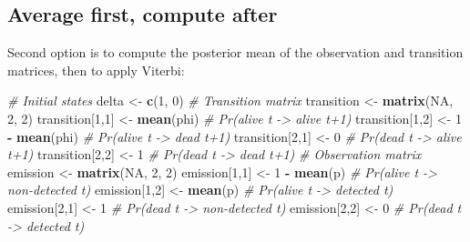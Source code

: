 \documentclass[
  12pt,
]{krantz}
\newenvironment{Shaded}{\begin{snugshade}}{\end{snugshade}}
\newcommand{\CommentTok}[1]{\textcolor[rgb]{0.56,0.35,0.01}{\textit{#1}}}
\newcommand{\ConstantTok}[1]{\textcolor[rgb]{0.56,0.35,0.01}{#1}}
\newcommand{\DecValTok}[1]{\textcolor[rgb]{0.00,0.00,0.81}{#1}}
\newcommand{\FunctionTok}[1]{\textcolor[rgb]{0.13,0.29,0.53}{\textbf{#1}}}
\newcommand{\NormalTok}[1]{#1}
\newcommand{\OtherTok}[1]{\textcolor[rgb]{0.56,0.35,0.01}{#1}}
\newcommand{\SpecialCharTok}[1]{\textcolor[rgb]{0.81,0.36,0.00}{\textbf{#1}}}
\begin{document}
\subsection{Average first, compute after}\label{average-first-compute-after}

Second option is to compute the posterior mean of the observation and transition matrices, then to apply Viterbi:

\begin{Shaded}
\begin{Highlighting}[]
\CommentTok{\# Initial states}
\NormalTok{delta }\OtherTok{\textless{}{-}} \FunctionTok{c}\NormalTok{(}\DecValTok{1}\NormalTok{, }\DecValTok{0}\NormalTok{)}
\CommentTok{\# Transition matrix}
\NormalTok{transition }\OtherTok{\textless{}{-}} \FunctionTok{matrix}\NormalTok{(}\ConstantTok{NA}\NormalTok{, }\DecValTok{2}\NormalTok{, }\DecValTok{2}\NormalTok{)}
\NormalTok{transition[}\DecValTok{1}\NormalTok{,}\DecValTok{1}\NormalTok{] }\OtherTok{\textless{}{-}} \FunctionTok{mean}\NormalTok{(phi)      }\CommentTok{\# Pr(alive t {-}\textgreater{} alive t+1)}
\NormalTok{transition[}\DecValTok{1}\NormalTok{,}\DecValTok{2}\NormalTok{] }\OtherTok{\textless{}{-}} \DecValTok{1} \SpecialCharTok{{-}} \FunctionTok{mean}\NormalTok{(phi)  }\CommentTok{\# Pr(alive t {-}\textgreater{} dead t+1)}
\NormalTok{transition[}\DecValTok{2}\NormalTok{,}\DecValTok{1}\NormalTok{] }\OtherTok{\textless{}{-}} \DecValTok{0}              \CommentTok{\# Pr(dead t {-}\textgreater{} alive t+1)}
\NormalTok{transition[}\DecValTok{2}\NormalTok{,}\DecValTok{2}\NormalTok{] }\OtherTok{\textless{}{-}} \DecValTok{1}              \CommentTok{\# Pr(dead t {-}\textgreater{} dead t+1)}
\CommentTok{\# Observation matrix }
\NormalTok{emission }\OtherTok{\textless{}{-}} \FunctionTok{matrix}\NormalTok{(}\ConstantTok{NA}\NormalTok{, }\DecValTok{2}\NormalTok{, }\DecValTok{2}\NormalTok{)}
\NormalTok{emission[}\DecValTok{1}\NormalTok{,}\DecValTok{1}\NormalTok{] }\OtherTok{\textless{}{-}} \DecValTok{1} \SpecialCharTok{{-}} \FunctionTok{mean}\NormalTok{(p)      }\CommentTok{\# Pr(alive t {-}\textgreater{} non{-}detected t)}
\NormalTok{emission[}\DecValTok{1}\NormalTok{,}\DecValTok{2}\NormalTok{] }\OtherTok{\textless{}{-}} \FunctionTok{mean}\NormalTok{(p)          }\CommentTok{\# Pr(alive t {-}\textgreater{} detected t)}
\NormalTok{emission[}\DecValTok{2}\NormalTok{,}\DecValTok{1}\NormalTok{] }\OtherTok{\textless{}{-}} \DecValTok{1}                \CommentTok{\# Pr(dead t {-}\textgreater{} non{-}detected t)}
\NormalTok{emission[}\DecValTok{2}\NormalTok{,}\DecValTok{2}\NormalTok{] }\OtherTok{\textless{}{-}} \DecValTok{0}                \CommentTok{\# Pr(dead t {-}\textgreater{} detected t)}

\end{Highlighting}
\end{Shaded}
\end{document}
